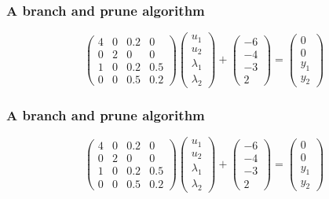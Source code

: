 \frame
{
\frametitle{A branch and prune algorithm}
\[\left(\begin{array}{cccc}
4&0&0.2&0\\
0&2&0&0\\
1&0&0.2&0.5\\
0&0&0.5&0.2
 \end{array}\right) \left(\begin{array}{c}
 u_1\\
 u_2\\
 \lambda_1\\
 \lambda_2
 \end{array}\right) + \left(\begin{array}{c}
 -6\\
 -4\\
 -3\\
 2
 \end{array}\right) =  \left(\begin{array}{c}
 0\\
 0\\
 y_1\\
 y_2
 \end{array}\right) 
 \]
\begin{figure}[h]
\centerline{
 \scalebox{0.5}{
    
 }
}
\end{figure}

}
\frame
{
\frametitle{A branch and prune algorithm}
\[\left(\begin{array}{cccc}
4&0&0.2&0\\
0&2&0&0\\
1&0&0.2&0.5\\
0&0&0.5&0.2
 \end{array}\right) \left(\begin{array}{c}
 u_1\\
 u_2\\
 \lambda_1\\
 \lambda_2
 \end{array}\right) + \left(\begin{array}{c}
 -6\\
 -4\\
 -3\\
 2
 \end{array}\right) =  \left(\begin{array}{c}
 0\\
 0\\
 y_1\\
 y_2
 \end{array}\right) 
 \]
\begin{figure}[h]
\centerline{
 \scalebox{0.5}{
    
 }
}
\end{figure}

}
